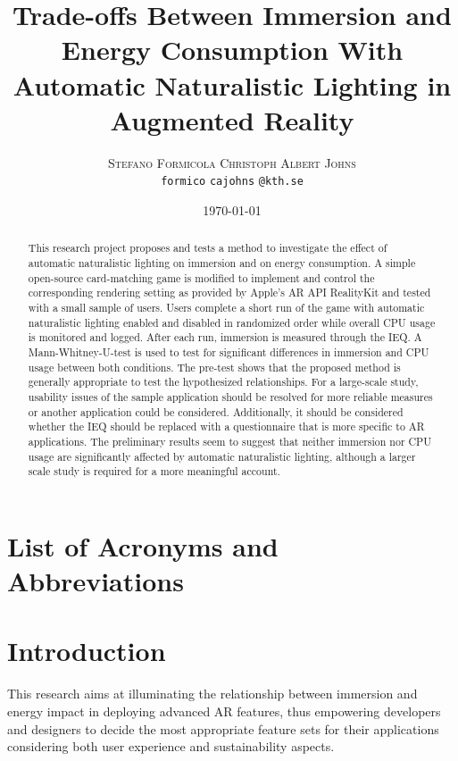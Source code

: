 \documentclass[12pt,twoside,english]{article}
\title{Trade-offs Between Immersion and Energy Consumption With Automatic Naturalistic Lighting in Augmented Reality}
\author{
        \textsc{Stefano Formicola}
            \qquad
        \textsc{Christoph Albert Johns}
        \mbox{}\\
        \normalsize
            \texttt{formico}
        \textbar{}
            \texttt{cajohns}
        \normalsize
            \texttt{@kth.se}
}
\date{\today}
\begin{document}
\maketitle


\begin{abstract}
\label{sec:abstract}

This research project proposes and tests a method to investigate the effect of automatic naturalistic lighting on immersion and on energy consumption.
A simple open-source card-matching game is modified to implement and control the corresponding rendering setting as provided by Apple's \gls{AR} API RealityKit and tested with a small sample of users.
Users complete a short run of the game with automatic naturalistic lighting enabled and disabled in randomized order while overall \gls{CPU} usage is monitored and logged.
After each run, immersion is measured through the \gls{IEQ}.
A Mann-Whitney-U-test is used to test for significant differences in immersion and \gls{CPU} usage between both conditions.
The pre-test shows that the proposed method is generally appropriate to test the hypothesized relationships.
For a large-scale study, usability issues of the sample application should be resolved for more reliable measures or another application could be considered.
Additionally, it should be considered whether the \gls{IEQ} should be replaced with a questionnaire that is more specific to \gls{AR} applications.
The preliminary results seem to suggest that neither immersion nor \gls{CPU} usage are significantly affected by automatic naturalistic lighting, although a larger scale study is required for a more meaningful account.

\end{abstract}
\clearpage

\tableofcontents

\section*{List of Acronyms and Abbreviations}
\label{list-of-acronyms-and-abbreviations}
\renewcommand{\glossarysection}[2][]{} %
\printglossary[type=\acronymtype, nonumberlist]

\clearpage
\section{Introduction}
\label{sect:introduction}

This research aims at illuminating the relationship between immersion and energy impact in deploying advanced \gls{AR} features, thus empowering developers and designers to decide the most appropriate feature sets for their applications considering both user experience and sustainability aspects.
\end{document}
